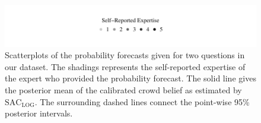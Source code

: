 \documentclass[aoas, preprint]{imsart}
\numberwithin{equation}{section}
\theoremstyle{plain}
\begin{document}
\begin{figure}[h!]
\vspace{-2em}
\centering
\hspace*{-3.5em} 	\includegraphics{Figures/LegendExamplePlot} %
\vspace{-3.5em}

\hspace{-0.5em}
 \hspace{0.5em}

\caption[Optional caption for list of figures]{Scatterplots of the probability forecasts given for two questions in our dataset. The shadings represents the self-reported expertise of the expert who provided the probability forecast. The solid line gives the posterior mean of the calibrated crowd belief as estimated by $\text{SAC}_{\text{LOG}}$. The surrounding dashed lines connect the point-wise 95\% posterior intervals.}
\label{ExamplePlotsFinal}
\end{figure}
\end{document}
